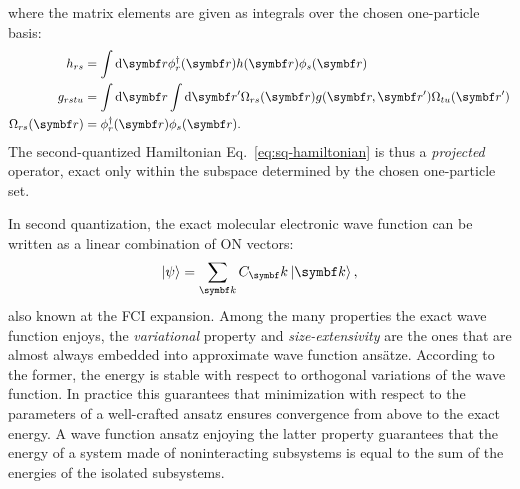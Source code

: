 where the matrix elements are given as integrals over the chosen
one-particle basis:
\begin{subequations}
 \begin{align}
   h_{rs} &= \int \diff\vect{r} \phi_r^\dagger(\vect{r}) h(\vect{r})\phi_s(\vect{r}) \label{eq:one-el}\\
   g_{rstu} &=
   \int\diff\vect{r}\int\diff\vect{r}^\prime
   \Omega_{rs}(\vect{r}) g(\vect{r},\vect{r}^\prime) \Omega_{tu}(\vect{r}^\prime) \label{eq:two-el} \\
  \Omega_{rs}(\vect{r}) &= \phi_r^\dagger(\vect{r})\phi_s(\vect{r}). \label{eq:overlap}
 \end{align}
\end{subequations}
The second-quantized Hamiltonian Eq.~\eqref{eq:sq-hamiltonian} is thus a
\emph{projected} operator, exact only within the subspace determined by
the chosen one-particle set.~\autocite{Gross1991-hi, Helgaker2000-tz}

In second quantization, the exact molecular electronic wave function can
be written as a linear combination of \acrshort{ON} vectors:
\begin{equation}\label{eq:fci}
  \ket{\psi} = \sum_{\vect{k}}C_\vect{k}\ket{\vect{k}},
\end{equation}
also known at the \gls{FCI} expansion.
Among the many properties the exact wave function enjoys, the
\emph{variational} property and \emph{size-extensivity} are the ones
that are almost always embedded into approximate wave function ans\"{a}tze.\autocite{Helgaker2000-tz}
According to the former, the energy is stable with respect to orthogonal
variations of the wave function. In practice this guarantees that
minimization with respect to the parameters of a well-crafted ansatz
ensures convergence from above to the exact energy.\autocite{Szabo1989-vl, McWeeny1992-oj, Helgaker2000-tz}
A wave function ansatz enjoying the latter property guarantees that the
energy of a system made of noninteracting subsystems is equal to the sum of
the energies of the isolated subsystems.\autocite{Helgaker2000-tz, Nooijen2005-ux}


